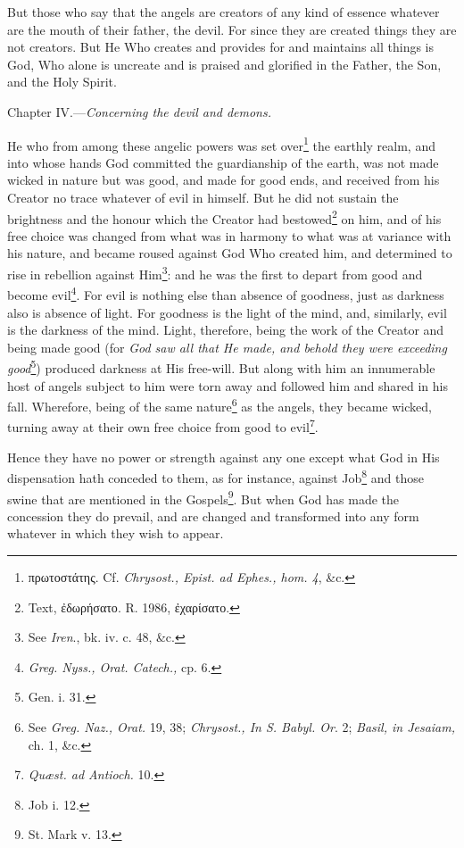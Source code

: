 But those who say that the angels are creators of any kind of essence whatever are the mouth of their father, the devil. For since they are created things they are not creators. But He Who creates and provides for and maintains all things is God, Who alone is uncreate and is praised and glorified in the Father, the Son, and the Holy Spirit.


Chapter IV.—\emph{Concerning the devil and demons.}

He who from among these angelic powers was set over\footnote{\textgreek{πρωτοστάτης}. Cf. \emph{Chrysost., Epist. ad Ephes., hom. 4}, \&c.} the earthly realm, and into whose hands God committed the guardianship of the earth, was not made wicked in nature but was good, and made for good ends, and received from his Creator no trace whatever of evil in himself. But he did not sustain the brightness and the honour which the Creator had bestowed\footnote{Text, \textgreek{ἐδωρήσατο}. R. 1986, \textgreek{ἐχαρίσατο.}} on him, and of his free choice was changed from what was in harmony to what was at variance with his nature, and became roused against God Who created him, and determined to rise in rebellion against Him\footnote{See \emph{Iren}., bk. iv. c. 48, \&c.}: and he was the first to depart from good and become evil\footnote{\emph{Greg. Nyss., Orat. Catech., }cp. 6.}. For evil is nothing else than absence of goodness, just as darkness also is absence of light. For goodness is the light of the mind, and, similarly, evil is the darkness of the mind. Light, therefore, being the work of the Creator and being made good (for \emph{God saw all that He made, and behold they were exceeding good}\footnote{Gen. i. 31.}) produced darkness at His free-will. But along with him an innumerable host of angels subject to him were torn away and followed him and shared in his fall. Wherefore, being of the same nature\footnote{See \emph{Greg. Naz., Orat. }19, 38; \emph{Chrysost., In S. Babyl. Or}. 2; \emph{Basil, in Jesaiam, }ch. 1, \&c.} as the angels, they became wicked, turning away at their own free choice from good to evil\footnote{\emph{Quæst. ad Antioch. }10.}.

Hence they have no power or strength against any one except what God in His dispensation hath conceded to them, as for instance, against Job\footnote{Job i. 12.} and those swine that are mentioned in the Gospels\footnote{St. Mark v. 13.}. But when God has made the concession they do prevail, and are changed and transformed into any form whatever in which they wish to appear.

